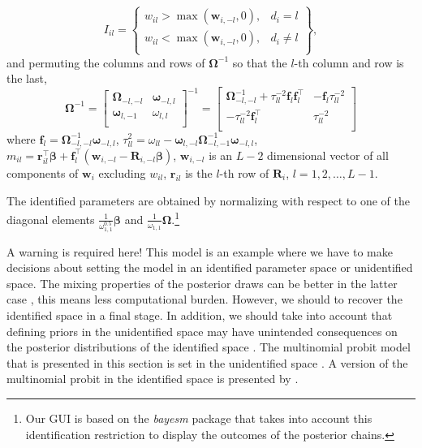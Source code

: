 \begin{equation*}
I_{il}=\begin{Bmatrix} w_{il}>\max(\bm{w}_{i,-l},0), & d_i=l\\
	w_{il}<\max(\bm{w}_{i,-l},0), & d_i\neq l\\
\end{Bmatrix},
\end{equation*}
and permuting the columns and rows of $\bm{\Omega}^{-1}$ so that the $l$-th column and row is the last,
\begin{equation*}
	\bm{\Omega}^{-1}=\begin{bmatrix}
		\bm{\Omega}_{-l,-l} & \bm\omega_{-l,l}\\
		\bm\omega_{l,-1} & \omega_{l,l}\\
	\end{bmatrix}^{-1}
	=\begin{bmatrix}
		\bm{\Omega}_{-l,-l}^{-1}+{\tau}^{-2}_{ll}\bm{f}_l\bm{f}_l^{\top} & -\bm{f}_l\tau^{-2}_{ll}\\
		-{\tau}^{-2}_{ll}\bm{f}_l^{\top} & {\tau}^{-2}_{ll}\\
	\end{bmatrix}
\end{equation*}
\noindent where $\bm{f}_l=\bm{\Omega}_{-l,-l}^{-1}\bm{\omega}_{-l,l}$, $\tau_{ll}^2= \omega_{ll}-\bm{\omega}_{l,-l}\bm{\Omega}^{-1}_{-l,-1}\bm{\omega}_{-l,l}$, $m_{il}=\bm{r}_{il}^{\top}\bm{\beta}+\bm{f}_l^{\top}(\bm{w}_{i,-l}-\bm{R}_{i,-l}\bm{\beta})$, $\bm{w}_{i,-l}$ is an $L-2$ dimensional vector of all components of $\bm{w}_i$ excluding $w_{il}$, $\bm{r}_{il}$ is the $l$-th row of $\bm{R}_i$, $l=1,2,\dots,L-1$. 

The identified parameters are obtained by normalizing with respect to one of the diagonal elements $\frac{1}{\omega_{1,1}^{0.5}}\bm{\beta}$ and $\frac{1}{\omega_{1,1}}\bm{\Omega}$.\footnote{Our GUI is based on the \textit{bayesm} package that takes into account this identification restriction to display the outcomes of the posterior chains.}

A warning is required here! This model is an example where we have to make decisions about setting the model in an identified parameter space or unidentified space. The mixing properties of the posterior draws can be better in the latter case \cite{mcculloch2000bayesian}, this means less computational burden. However, we should to recover the identified space in a final stage. In addition, we should take into account that defining priors in the unidentified space may have unintended consequences on the posterior distributions of the identified space \cite{nobile2000comment}. The multinomial probit model that is presented in this section is set in the unidentified space \cite{McCulloch1994}. A version of the multinomial probit in the identified space is presented by \cite{mcculloch2000bayesian}.\\ 

